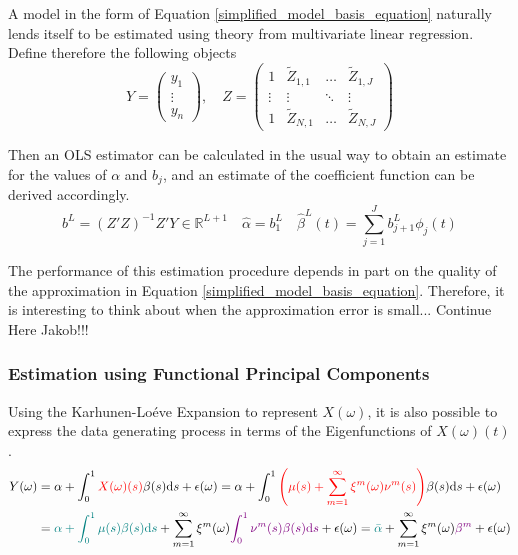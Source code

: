 \documentclass[11pt,twoside,a4paper]{article}
\begin{document}
	A model in the form of Equation \ref{simplified_model_basis_equation} naturally lends itself to be estimated using theory from multivariate linear regression. Define therefore the following objects
	\begin{equation}\label{regressor_mat_1}
		Y = \begin{pmatrix}
			y_1 \\ \vdots \\ y_n
		\end{pmatrix}, \quad
		Z = \begin{pmatrix}
			1 & \tilde{Z}_{1,1} & \dots & \tilde{Z}_{1,J} \\
			\vdots & \vdots & \ddots & \vdots \\
			1 & \tilde{Z}_{N,1} & \dots & \tilde{Z}_{N,J}
		\end{pmatrix}
	\end{equation}
	
	Then an OLS estimator can be calculated in the usual way to obtain an estimate for the values of $\alpha$ and $b_j$, and an estimate of the coefficient function can be derived accordingly.
	\begin{equation}
		b^L = \left(Z'Z\right)^{-1}Z'Y \in \mathbb{R}^{L+1} \quad \hat{\alpha} = b_{1}^{L} \quad \hat{\beta}^L(t) = \sum_{j = 1}^{J} b_{j+1}^L \phi_j(t)
	\end{equation}

	The performance of this estimation procedure depends in part on the quality of the approximation in Equation \ref{simplified_model_basis_equation}. Therefore, it is interesting to think about when the approximation error is small... {\color{red}Continue Here Jakob!!!}
	
	\subsubsection{Estimation using Functional Principal Components}\label{fpc_exp_transf}
	
	Using the Karhunen-Lo\'{e}ve Expansion to represent $X(\omega)$, it is also possible to express the data generating process in terms of the Eigenfunctions of $X(\omega)(t)$.
	\begin{equation}
		\begin{split}
			Y(\omega) &= \alpha + \int_{0}^{1} {\color{red}X(\omega)(s)} \beta(s) \mathrm{d}s + \epsilon(\omega)
			= \alpha + \int_{0}^{1} {\color{red}\left(\mu(s) + \sum_{m = 1}^{\infty} \xi^m(\omega) \nu^m(s)\right)} \beta(s) \mathrm{d}s + \epsilon(\omega)\\
			&= {\color{teal}\alpha + \int_{0}^{1} \mu(s) \beta(s) \mathrm{d}s} + \sum_{m = 1}^{\infty} \xi^m(\omega) {\color{violet}\int_{0}^{1} \nu^m(s) \beta(s) \mathrm{d}s} + \epsilon(\omega)
			= {\color{teal}\bar{\alpha}} + \sum_{m = 1}^{\infty} \xi^m(\omega) {\color{violet}\beta^m} + \epsilon(\omega)
		\end{split}
	\end{equation}
\end{document}
